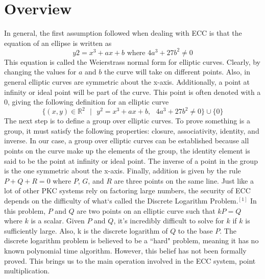\documentclass[conference]{IEEEtran}
\begin{document}
\section{Overview}
In general, the first assumption followed when dealing with ECC is that the equation of an ellipse is written as 
$$y2=x^3+ax+b \text{ where } 4a^3+27b^2 \neq 0$$
This equation is called the Weierstrass normal form for elliptic curves.  Clearly, by changing the values for $a$ and $b$ the curve will take on different points.  Also, in general elliptic curves are symmetric about the x-axis.  Additionally, a point at infinity or ideal point will be part of the curve.  This point is often denoted with a 0, giving the following definition for an elliptic curve
$$\{ (x,y) \in \mathbb{R}^2\text{ }|\text{ }y^2=x^3+ax+b,\text{ }4a^3+27b^2 \neq 0 \} \cup \{ 0 \}$$
The next step is to define a group over elliptic curves.  To prove something is a group, it must satisfy the following properties: closure, associativity, identity, and inverse.  In our case, a group over elliptic curves can be established because all points on the curve make up the elements of the group, the identity element is said to be the point at infinity or ideal point.  The inverse of a point in the group is the one symmetric about the x-axis.  Finally, addition is given by the rule $P + Q + R = 0$ where $P$, $G$, and $R$ are three points on the same line.  
Just like a lot of other PKC systems rely on factoring large numbers, the security of ECC depends on the difficulty of what`s called the Discrete Logarithm Problem.$^{[1]}$  In this problem, $P$ and $Q$ are two points on an elliptic curve such that $kP=Q$ where $k$ is a scalar.  Given $P$ and $Q$, it’s incredibly difficult to solve for $k$ if $k$ is sufficiently large.  Also, k is the discrete logarithm of $Q$ to the base $P$.  The discrete logarithm problem is believed to be a ``hard" problem, meaning it has no known polynomial time algorithm.  However, this belief has not been formally proved.  This brings us to the main operation involved in the ECC system, point multiplication.  
\end{document}
